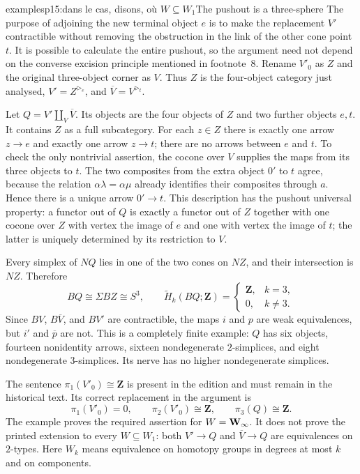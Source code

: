 \begin{dcomment}{examples}{p15:dans le cas, disons, où $W \subseteq W_1$}{The pushout is a three-sphere}
The purpose of adjoining the new terminal object $e$ is to make the replacement $V'$ contractible without removing the obstruction in the link of the other cone point $t$. It is possible to calculate the entire pushout, so the argument need not depend on the converse excision principle mentioned in footnote~8. Rename $V'_0$ as $Z$ and the original three-object corner as $V$. Thus $Z$ is the four-object category just analysed, $V'=Z^{\triangleright_e}$, and $\overline V=V^{\triangleright_t}$.

Let $Q=V'\amalg_V\overline V$. Its objects are the four objects of $Z$ and two further objects $e,t$. It contains $Z$ as a full subcategory. For each $z\in Z$ there is exactly one arrow $z\to e$ and exactly one arrow $z\to t$; there are no arrows between $e$ and $t$. To check the only nontrivial assertion, the cocone over $V$ supplies the maps from its three objects to $t$. The two composites from the extra object $0'$ to $t$ agree, because the relation $\alpha\lambda=\alpha\mu$ already identifies their composites through $a$. Hence there is a unique arrow $0'\to t$. This description has the pushout universal property: a functor out of $Q$ is exactly a functor out of $Z$ together with one cocone over $Z$ with vertex the image of $e$ and one with vertex the image of $t$; the latter is uniquely determined by its restriction to $V$.

Every simplex of $NQ$ lies in one of the two cones on $NZ$, and their intersection is $NZ$. Therefore
\[
 BQ\cong\Sigma BZ\cong S^3,
 \qquad \widetilde H_k(BQ;\mathbf Z)=
 \begin{cases}\mathbf Z,&k=3,\\0,&k\ne3.\end{cases}
\]
Since $BV$, $B\overline V$, and $BV'$ are contractible, the maps $i$ and $p$ are weak equivalences, but $i'$ and $\overline p$ are not. This is a completely finite example: $Q$ has six objects, fourteen nonidentity arrows, sixteen nondegenerate $2$-simplices, and eight nondegenerate $3$-simplices. Its nerve has no higher nondegenerate simplices.

The sentence $\pi_1(V'_0)\cong\mathbf Z$ is present in the edition and must remain in the historical text. Its correct replacement in the argument is
\[
 \pi_1(V'_0)=0,\qquad \pi_2(V'_0)\cong\mathbf Z,
 \qquad \pi_3(Q)\cong\mathbf Z.
\]
The example proves the required assertion for $W=\mathbf{W}_{\infty}$. It does not prove the printed extension to every $W\subseteq W_1$: both $V'\to Q$ and $\overline V\to Q$ are equivalences on $2$-types. Here $W_k$ means equivalence on homotopy groups in degrees at most $k$ and on components.


\end{dcomment}
